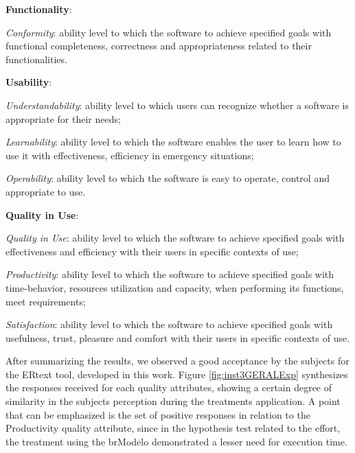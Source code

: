 \documentclass[a4paper,twoside,anonymous]{article}
\begin{document}
\begin{inparadesc}
    \item \textbf{Functionality}: 
        \begin{inparadesc}
            \item \textit{Conformity}: ability level to which the software to achieve specified goals with  functional completeness, correctness and appropriateness related to their functionalities.
        \end{inparadesc}
   
    \item \textbf{Usability}: 
        \begin{inparadesc}
            \item \textit{Understandability}: ability level to which users can recognize whether a software is appropriate for their needs; 
            \item \textit{Learnability}: ability level to which the software enables the user to learn how to use it with effectiveness, efficiency in emergency situations;
            \item \textit{Operability}: ability level to which the software is easy to operate, control and appropriate to use.
        \end{inparadesc}
    
    \item \textbf{Quality in Use}: 
        \begin{inparadesc}
            \item \textit{Quality in Use}: ability level to which the software to achieve specified goals with effectiveness and efficiency with their users in specific contexts of use;
            \item \textit{Productivity}: ability level to which the software to achieve specified goals with time-behavior, resources utilization and capacity, when performing its functions, meet requirements;
            \item \textit{Satisfaction}: ability level to which the software to achieve specified goals with usefulness, trust, pleasure and comfort with their users in specific contexts of use.
        \end{inparadesc}
\end{inparadesc}

After summarizing the results, we observed a good acceptance by the subjects for the ERtext tool, developed in this work.
Figure \ref{fig:inst3GERALExp} synthesizes the responses received for each quality attributes, showing a certain degree of similarity in the subjects perception during the treatments application.
A point that can be emphasized is the set of positive responses in relation to the Productivity quality attribute, since in the hypothesis test related to the effort, the treatment using the brModelo demonstrated a lesser need for execution time.
\end{document}
